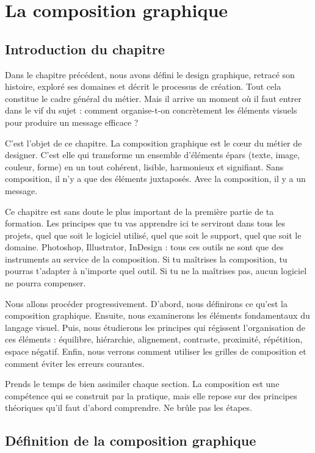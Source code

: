 \chapter{La composition graphique}
\section*{Introduction du chapitre}

Dans le chapitre précédent, nous avons défini le design graphique, retracé son histoire, exploré ses domaines et décrit le processus de création. Tout cela constitue le cadre général du métier. Mais il arrive un moment où il faut entrer dans le vif du sujet : comment organise-t-on concrètement les éléments visuels pour produire un message efficace ?

C'est l'objet de ce chapitre. La composition graphique est le cœur du métier de designer. C'est elle qui transforme un ensemble d'éléments épars (texte, image, couleur, forme) en un tout cohérent, lisible, harmonieux et signifiant. Sans composition, il n'y a que des éléments juxtaposés. Avec la composition, il y a un message.

Ce chapitre est sans doute le plus important de la première partie de ta formation. Les principes que tu vas apprendre ici te serviront dans tous les projets, quel que soit le logiciel utilisé, quel que soit le support, quel que soit le domaine. Photoshop, Illustrator, InDesign : tous ces outils ne sont que des instruments au service de la composition. Si tu maîtrises la composition, tu pourras t'adapter à n'importe quel outil. Si tu ne la maîtrises pas, aucun logiciel ne pourra compenser.

Nous allons procéder progressivement. D'abord, nous définirons ce qu'est la composition graphique. Ensuite, nous examinerons les éléments fondamentaux du langage visuel. Puis, nous étudierons les principes qui régissent l'organisation de ces éléments : équilibre, hiérarchie, alignement, contraste, proximité, répétition, espace négatif. Enfin, nous verrons comment utiliser les grilles de composition et comment éviter les erreurs courantes.

Prends le temps de bien assimiler chaque section. La composition est une compétence qui se construit par la pratique, mais elle repose sur des principes théoriques qu'il faut d'abord comprendre. Ne brûle pas les étapes.

\section{Définition de la composition graphique}

